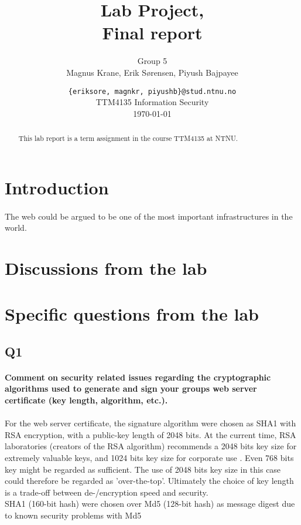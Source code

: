 \documentclass[a4paper,11pt]{article}
\title{Lab Project,\\Final report}
\author{Group 5 \\Magnus Krane, Erik S\o rensen, Piyush Bajpayee}
\date{ {\tt \{eriksore, magnkr, piyushb\}@stud.ntnu.no}\\
TTM4135 Information Security\\
\today}
\begin{document}
\maketitle
\vspace{3cm}
\begin{abstract}
This lab report is a term assignment in the course TTM4135 at NTNU. 
\end{abstract}
\section*{Introduction}
\paragraph{}The web could be argued to be one of the most important infrastructures in the world.
\section{Discussions from the lab}
\paragraph{}
\section{Specific questions from the lab}
\subsection{Q1}
\paragraph{Comment on security related issues regarding the cryptographic algorithms used to
generate and sign your groups web server certiﬁcate (key length, algorithm, etc.).}
\paragraph{} For the web server certificate, the signature algorithm were chosen as SHA1 with RSA encryption, with a public-key length of 2048 bits. At the current time, RSA laboratories (creators of the RSA algorithm) recommends a 2048 bits key size for extremely valuable keys, and 1024 bits key size for corporate use \cite{2}. Even 768 bits key might be regarded as sufficient. The use of 2048 bits key size in this case could therefore be regarded as 'over-the-top'. Ultimately the choice of key length is a trade-off between de-/encryption speed and security.\\
SHA1 (160-bit hash) were chosen over Md5 (128-bit hash) as message digest due to known security problems with Md5 \cite{3}
\end{document}
